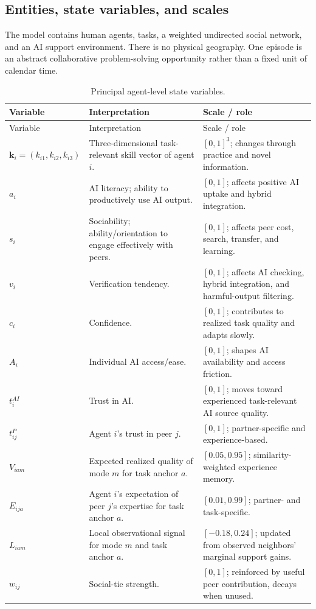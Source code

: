 \documentclass[11pt]{article}
\begin{document}
\subsection{Entities, state variables, and scales}
The model contains human agents, tasks, a weighted undirected social network, and an AI support environment. There is no physical geography. One episode is an abstract collaborative problem-solving opportunity rather than a fixed unit of calendar time.

\begin{longtable}{p{}p{}p{}}
\caption{Principal agent-level state variables.}\label{tab:agentstates}\\
\toprule
Variable & Interpretation & Scale / role \\
\midrule
\endfirsthead
\toprule
Variable & Interpretation & Scale / role \\
\midrule
\endhead
$\mathbf{k}_i=(k_{i1},k_{i2},k_{i3})$ & Three-dimensional task-relevant skill vector of agent $i$. & $[0,1]^3$; changes through practice and novel information. \\
$a_i$ & AI literacy; ability to productively use AI output. & $[0,1]$; affects positive AI uptake and hybrid integration. \\
$s_i$ & Sociability; ability/orientation to engage effectively with peers. & $[0,1]$; affects peer cost, search, transfer, and learning. \\
$v_i$ & Verification tendency. & $[0,1]$; affects AI checking, hybrid integration, and harmful-output filtering. \\
$c_i$ & Confidence. & $[0,1]$; contributes to realized task quality and adapts slowly. \\
$A_i$ & Individual AI access/ease. & $[0,1]$; shapes AI availability and access friction. \\
$t_i^{AI}$ & Trust in AI. & $[0,1]$; moves toward experienced task-relevant AI source quality. \\
$t_{ij}^{P}$ & Agent $i$'s trust in peer $j$. & $[0,1]$; partner-specific and experience-based. \\
$V_{iam}$ & Expected realized quality of mode $m$ for task anchor $a$. & $[0.05,0.95]$; similarity-weighted experience memory. \\
$E_{ija}$ & Agent $i$'s expectation of peer $j$'s expertise for task anchor $a$. & $[0.01,0.99]$; partner- and task-specific. \\
$L_{iam}$ & Local observational signal for mode $m$ and task anchor $a$. & $[-0.18,0.24]$; updated from observed neighbors' marginal support gains. \\
$w_{ij}$ & Social-tie strength. & $[0,1]$; reinforced by useful peer contribution, decays when unused. \\
\bottomrule
\end{longtable}
\end{document}
